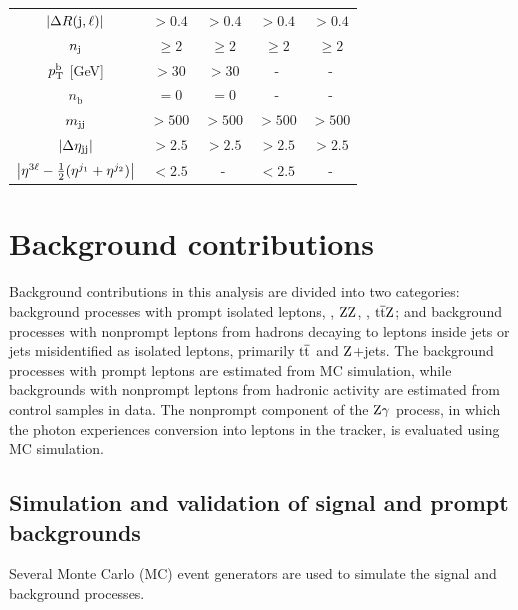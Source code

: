 \begin{table}[!ht]
\begin{center}
\begin{tabular}{c|c|c|c|c}
  $\left|\Delta R(\mathrm{j}, \ell)\right|$            & $ > 0.4$  & $> 0.4$       & $> 0.4$        & $> 0.4$ \\
  $n_{\mathrm{\mathrm{j}}}           $    & $\ge 2$   & $\ge 2$       & $\ge 2$        & $\ge 2$    \\
  $p_{\mathrm{T}}^{\mathrm{b}}         $ [GeV] & $ > 30$   & $ > 30$       &   -            &   -     \\
  $n_{\mathrm{b}}       $         & $= 0$     & $= 0$         &   -            &   -     \\
  $m_{\mathrm{jj}}             $               & $> 500$   & $> 500$       & $> 500$        & $> 500$ \\
  $\left|\Delta\eta_{\mathrm{jj}} \right|$            &$> 2.5$         & $> 2.5$ & $> 2.5$ & $> 2.5$ \\
  $\left| \eta^{3\ell} - \frac{1}{2}(\eta^{j_{1}} + \eta^{j_{2}}) \right|$            & $< 2.5$ & - & $< 2.5$ & - \\
  \end{tabular}
  \label{tab:selections}
  \end{center}
\end{table}

\section{Background contributions}
Background contributions in this analysis are divided into two categories:
background processes with prompt isolated leptons, \eg, 
$\mathrm{Z}\mathrm{Z}$, \tZq, ${\mathrm{t}\overline{\mathrm{t}}}\mathrm{Z}$;
and background processes with nonprompt leptons from hadrons decaying to leptons inside jets or
jets misidentified as isolated leptons, primarily ${\mathrm{t}\overline{\mathrm{t}}}$ and $\mathrm{Z}$+jets.
The background processes with prompt leptons are estimated from MC simulation, while backgrounds
with nonprompt leptons from hadronic activity are estimated from control samples in data.
The nonprompt component of the $\mathrm{Z}\gamma$ process,
in which the photon experiences conversion into leptons in the tracker,
is evaluated using MC simulation. 
\subsection{Simulation and validation of signal and prompt backgrounds}

Several Monte Carlo (MC) event generators are used to simulate the signal and
background processes.

